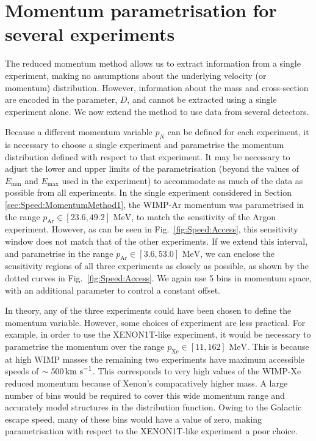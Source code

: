 \section{Momentum parametrisation for several experiments}
\label{sec:Speed:MomentumMethod2}

The reduced momentum method allows us to extract information from a single experiment, making no assumptions about the underlying velocity (or momentum) distribution. However, information about the mass and cross-section are encoded in the parameter, \(D\), and cannot be extracted using a single experiment alone. We now extend the method to use data from several detectors.

Because a different momentum variable \(p_N\) can be defined for each experiment, it is necessary to choose a single experiment and parametrise the momentum distribution defined with respect to that experiment. It may be necessary to adjust the lower and upper limits of the parametrisation (beyond the values of \(E_\textrm{min}\) and \(E_\textrm{max}\) used in the experiment) to accommodate as much of the data as possible from all experiments. In the single experiment considered in Section \ref{sec:Speed:MomentumMethod1}, the WIMP-Ar momentum was parametrised in the range \(p_\textrm{Ar} \in \left[23.6, 49.2\right] \textrm{ MeV}\), to match the sensitivity of the Argon experiment. However, as can be seen in Fig.\ \ref{fig:Speed:Access}, this sensitivity window does not match that of the other experiments. If we extend this interval, and parametrise in the range \(p_\textrm{Ar} \in \left[3.6, 53.0\right] \textrm{ MeV}\), we can enclose the sensitivity regions of all three experiments as closely as possible, as shown by the dotted curves in Fig.\ \ref{fig:Speed:Access}. We again use 5 bins in momentum space, with an additional parameter to control a constant offset.

In theory, any of the three experiments could have been chosen to define the momentum variable. However, some choices of experiment are less practical. For example, in order to use the XENON1T-like experiment, it would be necessary to parametrise the momentum over the range \(p_\textrm{Xe} \in \left[11 , 162\right] \textrm{ MeV}\). This is because at high WIMP masses the remaining two experiments have maximum accessible speeds of \(\sim 500 \,\textrm{km s}^{-1}\). This corresponds to very high values of the WIMP-Xe reduced momentum because of Xenon's comparatively higher mass. A large number of bins would be required to cover this wide momentum range and accurately model structures in the distribution function. Owing to the Galactic escape speed, many of these bins would have a value of zero, making parametrisation with respect to the XENON1T-like experiment a poor choice.

